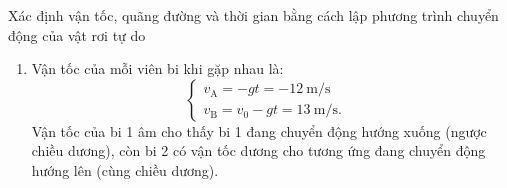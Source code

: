 \begin{dang}{Xác định vận tốc, quãng đường và thời gian bằng cách lập phương trình chuyển động của vật rơi tự do}
{\begin{enumerate}[label=\alph*.]
			Khi đó hai viên bi đang ở tọa độ 
			\begin{equation*}
				y_{\text{A}}=y_{\text{B}}=30-5t^2=\SI{22.8}{\meter}.
			\end{equation*}
			\item  Vận tốc của mỗi viên bi khi gặp nhau là:
			\begin{equation*}
				\left\{\begin{array}{ll}{v_{\text{A}}=-gt=\SI{-12}{\meter/\second}}&\\{v_{\text{B}}=v_0-gt=\SI{13}{\meter/\second}.}&\end{array}\right.
			\end{equation*}
			Vận tốc của bi 1 âm cho thấy bi 1 đang chuyển động hướng xuống (ngược chiều dương), còn bi 2 có vận tốc dương cho tương ứng đang chuyển động hướng lên (cùng chiều dương).
		\end{enumerate}
	}
\end{dang}

